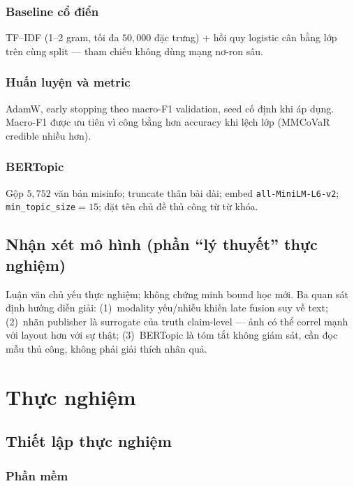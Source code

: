 \documentclass[12pt, a4paper]{report}
\begin{document}
\subsection{Baseline cổ điển}

TF--IDF (1--2 gram, tối đa $50{,}000$ đặc trưng) + hồi quy logistic cân bằng lớp trên cùng split --- tham chiếu không dùng mạng nơ-ron sâu.

\subsection{Huấn luyện và metric}

AdamW, early stopping theo macro-F1 validation, seed cố định khi áp dụng.
Macro-F1 được ưu tiên vì công bằng hơn accuracy khi lệch lớp (MMCoVaR credible nhiều hơn).

\subsection{BERTopic}

Gộp $5{,}752$ văn bản misinfo; truncate thân bài dài; embed \texttt{all-MiniLM-L6-v2}; \texttt{min\_topic\_size}$=15$; đặt tên chủ đề thủ công từ từ khóa.

\section{Nhận xét mô hình (phần ``lý thuyết'' thực nghiệm)}
\label{sec:theoretical-results}

Luận văn chủ yếu thực nghiệm; không chứng minh bound học mới.
Ba quan sát định hướng diễn giải:
(1)~modality yếu/nhiễu khiến late fusion suy về text;
(2)~nhãn publisher là surrogate của truth claim-level --- ảnh có thể correl mạnh với layout hơn với sự thật;
(3)~BERTopic là tóm tắt không giám sát, cần đọc mẫu thủ công, không phải giải thích nhân quả.

\chapter{Thực nghiệm}
\label{chap:experiments}

\section{Thiết lập thực nghiệm}
\label{sec:setup}

\subsection{Phần mềm}
\end{document}
